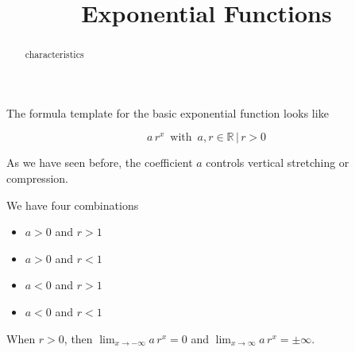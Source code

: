 \documentclass{ximera}
\title{Exponential Functions}
\begin{document}
\begin{abstract}
characteristics
\end{abstract}
\maketitle




The formula template for the basic exponential function looks like




\[  a \, r^x   \, \text{ with } \,  a, r \in \mathbb{R} \, | \,  r > 0   \]


As we have seen before, the coefficient $a$ controls vertical stretching or compression.




We have four combinations

\begin{itemize}
\item $a>0$ and $r>1$
\item $a>0$ and $r<1$
\item $a<0$ and $r>1$
\item $a<0$ and $r<1$
\end{itemize}


When $r>0$, then $\lim_{x \to -\infty} a \, r^x = 0$ and $\lim_{x \to \infty} a \, r^x = \pm\infty$.  \\
\end{document}
